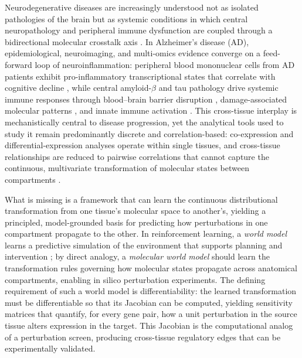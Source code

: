 \documentclass[12pt,a4paper]{article}
\begin{document}
Neurodegenerative diseases are increasingly understood not as isolated pathologies of the brain but as systemic conditions in which central neuropathology and peripheral immune dysfunction are coupled through a bidirectional molecular crosstalk axis \citep{bettcher2021}. In Alzheimer's disease (AD), epidemiological, neuroimaging, and multi-omics evidence converge on a feed-forward loop of neuroinflammation: peripheral blood mononuclear cells from AD patients exhibit pro-inflammatory transcriptional states that correlate with cognitive decline \citep{gate2024, xu2023}, while central amyloid-$\beta$ and tau pathology drive systemic immune responses through blood--brain barrier disruption \citep{sweeney2018, nation2019}, damage-associated molecular patterns \citep{venegas2017}, and innate immune activation \citep{hessel2023}. This cross-tissue interplay is mechanistically central to disease progression, yet the analytical tools used to study it remain predominantly discrete and correlation-based: co-expression and differential-expression analyses operate within single tissues, and cross-tissue relationships are reduced to pairwise correlations that cannot capture the continuous, multivariate transformation of molecular states between compartments \citep{wang2022}.

What is missing is a framework that can learn the continuous distributional transformation from one tissue's molecular space to another's, yielding a principled, model-grounded basis for predicting how perturbations in one compartment propagate to the other. In reinforcement learning, a \emph{world model} learns a predictive simulation of the environment that supports planning and intervention \citep{ha2018}; by direct analogy, a \emph{molecular world model} should learn the transformation rules governing how molecular states propagate across anatomical compartments, enabling in silico perturbation experiments. The defining requirement of such a world model is differentiability: the learned transformation must be differentiable so that its Jacobian can be computed, yielding sensitivity matrices that quantify, for every gene pair, how a unit perturbation in the source tissue alters expression in the target. This Jacobian is the computational analog of a perturbation screen, producing cross-tissue regulatory edges that can be experimentally validated.
\end{document}
